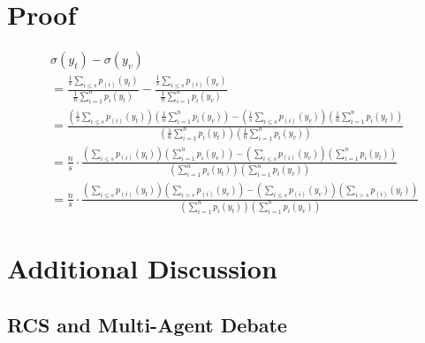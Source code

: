 \documentclass[11pt]{article}
\begin{document}
\section{Proof}
\label{app:ac}

\begin{align*}
&\sigma(y_t) - \sigma(y_v) \\
&=
\frac{\frac{1}{s} \sum_{i \le s} p_{(i)}(y_t)}
     {\frac{1}{n} \sum_{i=1}^{n} p_i(y_t)}
-
\frac{\frac{1}{s} \sum_{i \le s} p_{(i)}(y_v)}
     {\frac{1}{n} \sum_{i=1}^{n} p_i(y_v)}
\\[2mm]
&=
\frac{
\left( \frac{1}{s} \sum_{i \le s} p_{(i)}(y_t) \right)
\left( \frac{1}{n} \sum_{i=1}^{n} p_i(y_v) \right)
-
\left( \frac{1}{s} \sum_{i \le s} p_{(i)}(y_v) \right)
\left( \frac{1}{n} \sum_{i=1}^{n} p_i(y_t) \right)
}{
\left( \frac{1}{n} \sum_{i=1}^{n} p_i(y_t) \right)
\left( \frac{1}{n} \sum_{i=1}^{n} p_i(y_v) \right)
}
\\[2mm]
&=
\frac{n}{s} \cdot
\frac{
\left( \sum_{i \le s} p_{(i)}(y_t) \right)
\left( \sum_{i=1}^{n} p_i(y_v) \right)
-
\left( \sum_{i \le s} p_{(i)}(y_v) \right)
\left( \sum_{i=1}^{n} p_i(y_t) \right)
}{
\left( \sum_{i=1}^{n} p_i(y_t) \right)
\left( \sum_{i=1}^{n} p_i(y_v) \right)
}
\\[2mm]
&=
\frac{n}{s} \cdot
\frac{
\left( \sum_{i \le s} p_{(i)}(y_t) \right)
\left( \sum_{i > s} p_{(i)}(y_v) \right)
-
\left( \sum_{i \le s} p_{(i)}(y_v) \right)
\left( \sum_{i > s} p_{(i)}(y_t) \right)
}{
\left( \sum_{i=1}^{n} p_i(y_t) \right)
\left( \sum_{i=1}^{n} p_i(y_v) \right)
}
\end{align*}


\section{Additional Discussion}
\subsection{RCS and Multi-Agent Debate}
\end{document}
